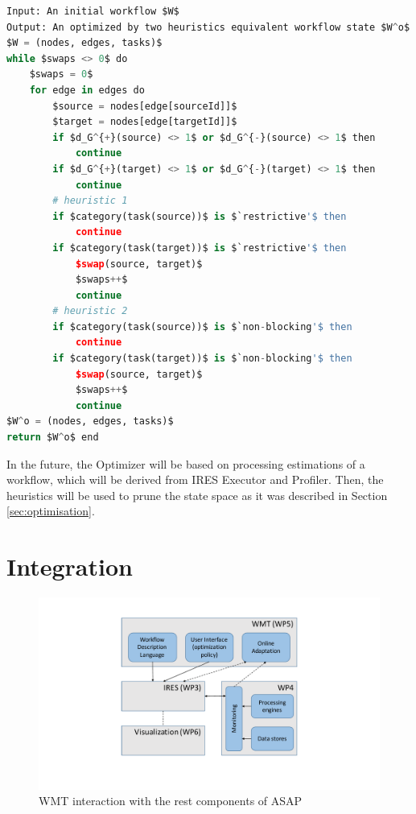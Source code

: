 \documentclass[12pt,openany,onecolumn]{book}
\begin{document}
\begin{lstlisting}[caption={Optimization algorithm}, label={lst:optimisation}, language=Python, firstnumber=1, mathescape=true]
Input: An initial workflow $W$
Output: An optimized by two heuristics equivalent workflow state $W^o$
$W = (nodes, edges, tasks)$
while $swaps <> 0$ do
	$swaps = 0$
	for edge in edges do
		$source = nodes[edge[sourceId]]$
		$target = nodes[edge[targetId]]$
		if $d_G^{+}(source) <> 1$ or $d_G^{-}(source) <> 1$ then
			continue
		if $d_G^{+}(target) <> 1$ or $d_G^{-}(target) <> 1$ then
			continue
		# heuristic 1
		if $category(task(source))$ is $`restrictive'$ then
			continue
		if $category(task(target))$ is $`restrictive'$ then
			$swap(source, target)$
			$swaps++$
			continue
		# heuristic 2
		if $category(task(source))$ is $`non-blocking'$ then
			continue
		if $category(task(target))$ is $`non-blocking'$ then
			$swap(source, target)$
			$swaps++$
			continue
$W^o = (nodes, edges, tasks)$
return $W^o$ end
\end{lstlisting}

In the future, the Optimizer will be based on processing estimations of a workflow, which will be derived from IRES Executor and Profiler. Then, the heuristics will be used to prune the state space as it was described in Section \ref{sec:optimisation}.

\section{Integration}\label{sec:integration}

\begin{figure}[h]
\centering
\includegraphics[width=\linewidth]{figs/ASAP_scheme}
\caption{WMT interaction with the rest components of ASAP}\label{fig:ASAP_scheme}
\end{figure}
\end{document}
